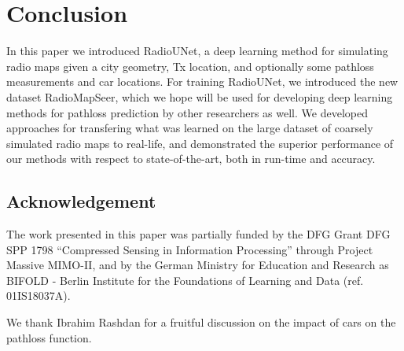 \documentclass[10pt,a4paper]{article}
\begin{document}
\section{Conclusion}


In this paper we introduced RadioUNet, a deep learning method for simulating radio maps given a city geometry, Tx location, and optionally some pathloss measurements and car locations. For training RadioUNet, we introduced the new dataset RadioMapSeer, which we hope will be used for developing deep learning methods for pathloss prediction by other researchers as well. 
We developed approaches for transfering what was learned on the large dataset of coarsely simulated radio maps to real-life, and demonstrated the superior performance of our methods with respect to state-of-the-art, both in run-time and accuracy.









\subsection*{Acknowledgement }

The work presented in this paper was partially funded by the DFG Grant DFG SPP 1798 “Compressed Sensing in Information Processing” through Project Massive MIMO-II, and by the German Ministry for Education and Research as BIFOLD - Berlin Institute for the Foundations of Learning and Data (ref. 01IS18037A).

We thank Ibrahim Rashdan for a fruitful discussion on the impact of cars on the pathloss function.




%
%
%



{\small

}
\end{document}
